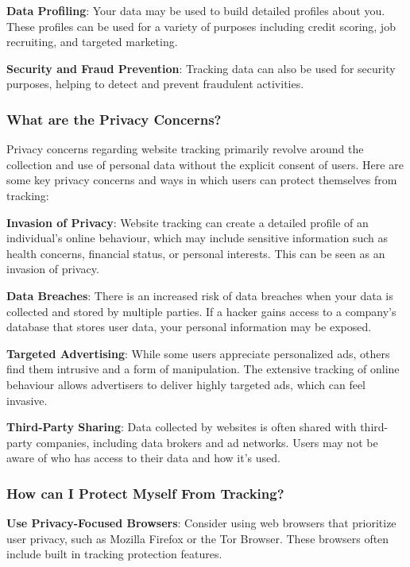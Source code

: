 \documentclass[
  letterpaper,
  DIV=11,
  numbers=noendperiod]{scrreprt}
\begin{document}
\textbf{Data Profiling}: Your data may be used to build detailed
profiles about you. These profiles can be used for a variety of purposes
including credit scoring, job recruiting, and targeted marketing.

\textbf{Security and Fraud Prevention}: Tracking data can also be used
for security purposes, helping to detect and prevent fraudulent
activities.

\subsubsection*{What are the Privacy
Concerns?}\label{what-are-the-privacy-concerns}

Privacy concerns regarding website tracking primarily revolve around the
collection and use of personal data without the explicit consent of
users. Here are some key privacy concerns and ways in which users can
protect themselves from tracking:

\textbf{Invasion of Privacy}: Website tracking can create a detailed
profile of an individual's online behaviour, which may include sensitive
information such as health concerns, financial status, or personal
interests. This can be seen as an invasion of privacy.

\textbf{Data Breaches}: There is an increased risk of data breaches when
your data is collected and stored by multiple parties. If a hacker gains
access to a company's database that stores user data, your personal
information may be exposed.

\textbf{Targeted Advertising}: While some users appreciate personalized
ads, others find them intrusive and a form of manipulation. The
extensive tracking of online behaviour allows advertisers to deliver
highly targeted ads, which can feel invasive.

\textbf{Third-Party Sharing}: Data collected by websites is often shared
with third-party companies, including data brokers and ad networks.
Users may not be aware of who has access to their data and how it's
used.

\subsubsection*{How can I Protect Myself From
Tracking?}\label{how-can-i-protect-myself-from-tracking}

\textbf{Use Privacy-Focused Browsers}: Consider using web browsers that
prioritize user privacy, such as Mozilla Firefox or the Tor Browser.
These browsers often include built in tracking protection features.
\end{document}
